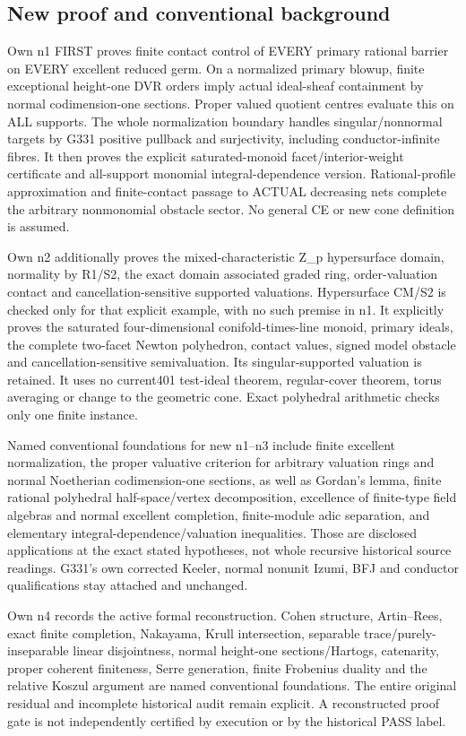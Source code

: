 \documentclass[11pt]{article}
\begin{document}
\subsection{New proof and conventional background}

Own n1 FIRST proves finite contact control of EVERY primary rational barrier on EVERY excellent reduced germ. On a normalized primary blowup, finite exceptional height-one DVR orders imply actual ideal-sheaf containment by normal codimension-one sections. Proper valued quotient centres evaluate this on ALL supports. The whole normalization boundary handles singular/nonnormal targets by G331 positive pullback and surjectivity, including conductor-infinite fibres. It then proves the explicit saturated-monoid facet/interior-weight certificate and all-support monomial integral-dependence version. Rational-profile approximation and finite-contact passage to ACTUAL decreasing nets complete the arbitrary nonmonomial obstacle sector. No general CE or new cone definition is assumed.

Own n2 additionally proves the mixed-characteristic Z\_p hypersurface domain, normality by R1/S2, the exact domain associated graded ring, order-valuation contact and cancellation-sensitive supported valuations. Hypersurface CM/S2 is checked only for that explicit example, with no such premise in n1. It explicitly proves the saturated four-dimensional conifold-times-line monoid, primary ideals, the complete two-facet Newton polyhedron, contact values, signed model obstacle and cancellation-sensitive semivaluation. Its singular-supported valuation is retained. It uses no current401 test-ideal theorem, regular-cover theorem, torus averaging or change to the geometric cone. Exact polyhedral arithmetic checks only one finite instance.

Named conventional foundations for new n1--n3 include finite excellent normalization, the proper valuative criterion for arbitrary valuation rings and normal Noetherian codimension-one sections, as well as Gordan's lemma, finite rational polyhedral half-space/vertex decomposition, excellence of finite-type field algebras and normal excellent completion, finite-module adic separation, and elementary integral-dependence/valuation inequalities. Those are disclosed applications at the exact stated hypotheses, not whole recursive historical source readings. G331's own corrected Keeler, normal nonunit Izumi, BFJ and conductor qualifications stay attached and unchanged.

Own n4 records the active formal reconstruction. Cohen structure, Artin--Rees, exact finite completion, Nakayama, Krull intersection, separable trace/purely-inseparable linear disjointness, normal height-one sections/Hartogs, catenarity, proper coherent finiteness, Serre generation, finite Frobenius duality and the relative Koszul argument are named conventional foundations. The entire original residual and incomplete historical audit remain explicit. A reconstructed proof gate is not independently certified by execution or by the historical PASS label.
\end{document}
